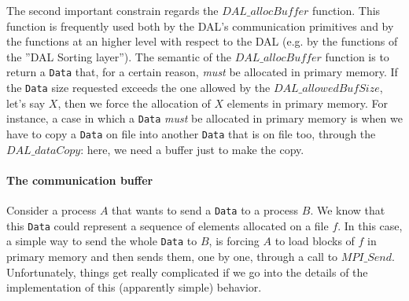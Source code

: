 The second important constrain regards the $DAL\_allocBuffer$ function. This function is frequently used both by the DAL's communication primitives and by the functions at an higher level with respect to the DAL (e.g. by the functions of the ''DAL Sorting layer''). The semantic of the $DAL\_allocBuffer$ function is to return a \texttt{Data} that, for a certain reason, \textit{must} be allocated in primary memory. If the \texttt{Data} size requested exceeds the one allowed by the $DAL\_allowedBufSize$, let's say $X$, then we force the allocation of $X$ elements in primary memory. For instance, a case in which a \texttt{Data} \textit{must} be allocated in primary memory is when we have to copy a \texttt{Data} on file into another \texttt{Data} that is on file too, through the $DAL\_dataCopy$: here, we need a buffer just to make the copy.  

\paragraph{The communication buffer}
Consider a process $A$ that wants to send a \texttt{Data} to a process $B$. We know that this \texttt{Data} could represent a sequence of elements allocated on a file $f$. In this case, a simple way to send the whole \texttt{Data} to $B$, is forcing $A$ to load blocks of $f$ in primary memory and then sends them, one by one, through a call to $MPI\_Send$.  Unfortunately, things get really complicated if we go into the details of the implementation of this (apparently simple) behavior. 

